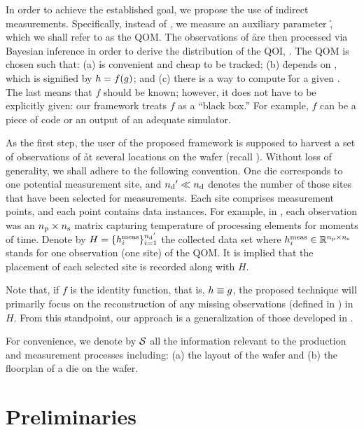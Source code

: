 In order to achieve the established goal, we propose the use of indirect
measurements. Specifically, instead of \g, we measure an auxiliary parameter \h,
which we shall refer to as the \ac{QOM}. The observations of \h are then
processed via Bayesian inference in order to derive the distribution of the
\ac{QOI}, \g. The \ac{QOM} is chosen such that: (a) \h is convenient and cheap
to be tracked; (b) \h depends on \g, which is signified by $h = f(g)$; and (c)
there is a way to compute \h for a given \g. The last means that $f$ should be
known; however, it does not have to be explicitly given: our framework treats
$f$ as a ``black box.'' For example, $f$ can be a piece of code or an output of
an adequate simulator.

As the first step, the user of the proposed framework is supposed to harvest a
set of observations of \h at several locations on the wafer (recall
). Without loss of generality, we shall adhere to the following
convention. One die corresponds to one potential measurement site, and ${n_\mathrm{d}}' \ll
{n_\mathrm{d}}$ denotes the number of those sites that have been selected for measurements.
Each site comprises \np measurement points, and each point contains \ns data
instances. For example, in , each observation was an ${n_\mathrm{p}}
\times {n_\mathrm{s}}$ matrix capturing temperature of \np processing elements for \ns
moments of time. Denote by $H = \{ h_i^{\mathrm{meas}} \}_{i = 1}^{{n_\mathrm{d}}'}$ the
collected data set where $h_i^{\mathrm{meas}} \in \mathbb{R}^{{n_\mathrm{p}} \times {n_\mathrm{s}}}$ stands for
one observation (one site) of the \ac{QOM}. It is implied that the placement of
each selected site is recorded along with $H$.

Note that, if $f$ is the identity function, that is, $h \equiv g$, the
proposed technique will primarily focus on the reconstruction of any missing
observations (defined in ) in $H$. From this
standpoint, our approach is a generalization of those developed in
\cite{zhang2010, reda2009}.

For convenience, we denote by $\mathcal{S}$ all the information relevant to the
production and measurement processes including: (a) the layout of the wafer and
(b) the floorplan of a die on the wafer.

\section{Preliminaries}

